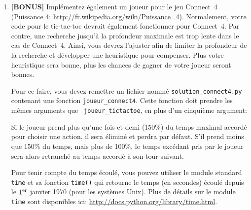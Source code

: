 \documentclass{article}
\newenvironment{itemize*}%
  {\vspace*{.1cm}\begin{itemize}%
      \setlength{\itemsep}{0pt}%
      \setlength{\parskip}{0pt}}%
  {\end{itemize}\vspace*{.1cm}}
\begin{document}
\begin{enumerate}[itemsep=20pt]
  Si vous désirez voir comment ce comporte votre agent, utilisez
  l'option {\tt -v} pour faire afficher la grille après chaque coup.

  La correction de votre code se fera
  de façon automatique, en vérifiant automatiquement l'ensemble des états
  visités par votre recherche alpha-bêta. Puisque l'ensemble des états
  visités dépend de l'ordre dans lequel les états successeurs sont générés,
  on vous demande de {\bf toujours} utiliser l'ordre suggéré par Python
  en itérant sur les items du dictionnaire:

\begin{verbatim}
for action,nouvel_etat in fct_transitions(etat).items():
    # Votre code
    ...

\end{verbatim}

  {\bf Conseil:} assurez-vous que votre joueur puisse jouer {\bf parfaitement}
  les {\tt 'X'} ainsi que les {\tt 'O'}.

\newpage

\item {\bf [BONUS]} Implémentez également un joueur pour le jeu
  Connect~4 (Puissance 4:
  \url{http://fr.wikipedia.org/wiki/Puissance_4}).
  Normalement, votre code pour le tic-tac-toe
  devrait également fonctionner pour Connect~4. Par contre, une
  recherche jusqu'à la profondeur maximale est trop lente dans le cas
  de Connect~4. Ainsi, vous devrez l'ajuster afin de limiter la
  profondeur de la recherche et développer une heuristique pour
  compenser. Plus votre heuristique sera bonne, plus les chances de
  gagner de votre joueur seront bonnes.

  Pour ce faire, vous devez remettre un fichier nommé {\tt solution\_connect4.py}
  contenant une fonction {\tt joueur\_connect4}. Cette
  fonction doit prendre les mêmes arguments que {\tt
    joueur\_tictactoe}, en plus d'un cinquième argument:
  Si le joueur prend plus qu'une fois et demi (150\%) du temps
  maximal accordé pour choisir une action, il sera éliminé et perdra
  par défaut. S'il prend moins que 150\% du temps, mais plus de 100\%,
  le temps excédant pris par le joueur sera alors retranché au temps
  accordé à son tour suivant.

  Pour tenir compte du temps écoulé, vous pouvez utiliser le module
  standard {\tt time} et sa fonction {\tt time()} qui retourne le
  temps (en secondes) écoulé depuis le $1^{\rm er}$ janvier 1970 (pour
  les systèmes Unix). Plus de détails sur le module {\tt time} sont
  disponibles ici:
  \url{http://docs.python.org/library/time.html}.


\end{enumerate}
\end{document}

